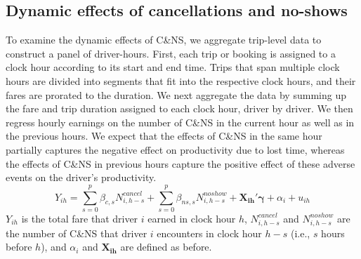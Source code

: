 \documentclass[reviewmode]{restat}
\begin{document}



\subsection{Dynamic effects of cancellations and no-shows}
To examine the dynamic effects of C\&NS, we aggregate trip-level data to construct a panel of driver-hours. 
First, each trip or booking is assigned to a clock hour according to its start and end time.
Trips that span multiple clock hours are divided into segments that fit into the respective clock hours,
and their fares are prorated to the duration. We next aggregate the data by summing up the fare and trip 
duration assigned to each clock hour, driver by driver. We then regress hourly earnings 
on the number of C\&NS in the current hour as well as in the previous hours. We expect that the effects of
C\&NS in the same hour partially captures the negative effect on productivity due to lost time, 
whereas the effects of C\&NS in previous hours capture the positive effect of these adverse events on 
the driver's productivity.
\begin{equation}
Y_{ih} = \sum_{s=0}^p \beta_{c,s} N^{cancel}_{i,h-s} + \sum_{s=0}^p \beta_{ns,s} N^{noshow}_{i,h-s} +  \mathbf{X_{ih}}'\mathbf{\gamma} + \alpha_i + u_{ih}
\end{equation}
$Y_{ih}$ is the total fare that driver $i$ earned in clock hour $h$, $N^{cancel}_{i, h-s}$ and $N^{noshow}_{i, h-s}$ are the number of C\&NS that driver $i$ encounters in clock hour $h-s$ (i.e., $s$ hours before $h$), and $\alpha_i$ and $\mathbf{X_{ih}}$ are defined as before.
\end{document}
